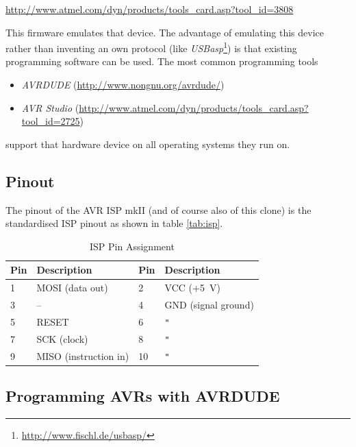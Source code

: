 \documentclass[bibtotoc,UKenglish,halfparskip,oneside,DIV12]{scrreprt}
\begin{document}
 \url{http://www.atmel.com/dyn/products/tools_card.asp?tool_id=3808}

This firmware emulates that device. The advantage of emulating this device rather than inventing an
own protocol (like \emph{USBasp}\footnote{\url{http://www.fischl.de/usbasp/}}) is that existing
programming software can be used. The most common programming tools

\begin{itemize}
  \item \emph{AVRDUDE} (\url{http://www.nongnu.org/avrdude/})
  \item \emph{AVR Studio} (\url{http://www.atmel.com/dyn/products/tools_card.asp?tool_id=2725})
\end{itemize}

support that hardware device on all operating systems they run on.

\subsection{Pinout}
\label{sec:avrisp_pinout}

The pinout of the AVR ISP mkII (and of course also of this clone) is the standardised ISP pinout as
shown in table \vref{tab:isp}.

\begin{table}[ht]
  \centering
  \begin{tabular}{|p{1cm}p{5cm}|p{1cm}p{5cm}|}
    \hline
    \textbf{Pin} & \textbf{Description} & \textbf{Pin} & \textbf{Description} \\
    \hline
    \hline
    1            & MOSI (data out)       & 2            & VCC (+5~V)           \\
    3            & --                    & 4            & GND (signal ground)  \\
    5            & RESET                 & 6            & \verb+"+             \\
    7            & SCK (clock)           & 8            & \verb+"+             \\
    9            & MISO (instruction in) & 10           & \verb+"+             \\
    \hline
  \end{tabular}
  \caption{ISP Pin Assignment}
  \label{tab:isp}
\end{table}

\subsection{Programming AVRs with AVRDUDE}
\end{document}
